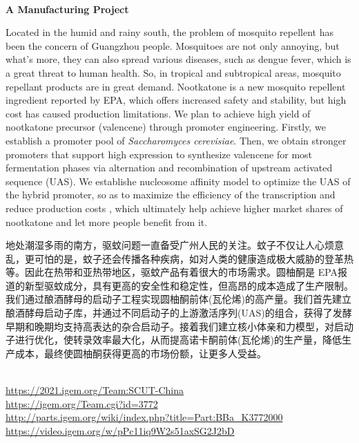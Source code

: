 \textbf{\\A Manufacturing Project\\}\begin{spacing}{1.5}

Located in the humid and rainy south, the problem of mosquito repellent has been the concern of Guangzhou people. Mosquitoes are not only annoying, but what’s more, they can also spread various diseases, such as dengue fever, which is a great threat to human health. So, in tropical and subtropical areas, mosquito repellant products are in great demand. Nootkatone is a new mosquito repellent ingredient reported by EPA, which offers increased safety and stability, but high cost has caused production limitations. We plan to achieve high yield of nootkatone precursor (valencene) through promoter engineering. Firstly, we establish a promoter pool of \textit{Saccharomyces cerevisiae}. Then, we obtain stronger promoters that support high expression to synthesize valencene for most fermentation phases via alternation and recombination of upstream activated sequence (UAS). We establishe nucleosome affinity model to optimize the UAS of the hybrid promoter, so as to maximize the efficiency of the transcription and reduce production costs , which ultimately help achieve higher market shares of nootkatone and let more people benefit from it.

地处潮湿多雨的南方，驱蚊问题一直备受广州人民的关注。蚊子不仅让人心烦意乱，更可怕的是，蚊子还会传播各种疾病，如对人类的健康造成极大威胁的登革热等。因此在热带和亚热带地区，驱蚊产品有着很大的市场需求。圆柚酮是 EPA报道的新型驱蚊成分，具有更高的安全性和稳定性，但高昂的成本造成了生产限制。我们通过酿酒酵母的启动子工程实现圆柚酮前体(瓦伦烯)的高产量。我们首先建立酿酒酵母启动子库，并通过不同启动子的上游激活序列(UAS)的组合，获得了发酵早期和晚期均支持高表达的杂合启动子。接着我们建立核小体亲和力模型，对启动子进行优化，使转录效率最大化，从而提高诺卡酮前体(瓦伦烯)的生产量，降低生产成本，最终使圆柚酮获得更高的市场份额，让更多人受益。\end{spacing}
\\

\url{https://2021.igem.org/Team:SCUT-China }\\
\url{https://igem.org/Team.cgi?id=3772 }\\
\url{http://parts.igem.org/wiki/index.php?title=Part:BBa_K3772000 }\\
\url{https://video.igem.org/w/pPc11iq9W2s51axSG2J2bD }\\

\vfill{}









